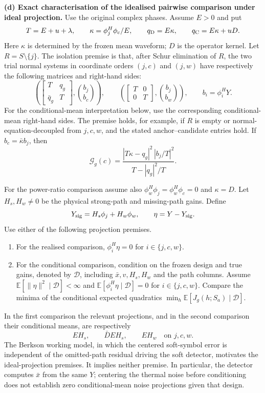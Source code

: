 \begin{afdmprop}
\medskip\noindent
\textup{\textbf{(d) Exact characterisation of the idealised pairwise
comparison under ideal projection.}}
Use the original complex phases. Assume $E>0$ and put
\[
 T=E+u+\lambda,\qquad \kappa=\phi_j^H\phi_c/E,\qquad
 q_{\rm D}=E\kappa,\qquad q_{\rm C}=E\kappa+uD .
\]
Here $\kappa$ is determined by the frozen mean waveform; $D$ is the
operator kernel. Let $R=S\setminus\{j\}$. The isolation premise is
that, after Schur elimination of $R$, the two trial normal systems
in coordinate orders $(j,c)$ and $(j,w)$ have respectively the
following matrices and right-hand sides:
\[
 \left(
 \begin{bmatrix} T&q_g\\ \bar q_g&T\end{bmatrix},
 \binom{b_j}{b_c}
 \right),\qquad
 \left(
 \begin{bmatrix} T&0\\0&T\end{bmatrix},
 \binom{b_j}{b_w}
 \right), \qquad b_i=\phi_i^HY .
\]
For the conditional-mean interpretation below, use the corresponding
conditional-mean right-hand sides. The premise holds, for example,
if $R$ is empty or normal-equation-decoupled from $j,c,w$, and the
stated anchor--candidate entries hold. If $b_c=\bar\kappa b_j$, then
\begin{equation}
 \mathcal G_g(c)=
 \frac{|T\kappa-q_g|^2\,|b_j/T|^2}{T-|q_g|^2/T}.
 \label{eq:af-admission}
\end{equation}

For the power-ratio comparison assume also
$\phi_w^H\phi_j=\phi_w^H\phi_c=0$ and $\kappa=D$. Let
$H_s,H_w\ne0$ be the physical strong-path and missing-path gains.
Define
\[
 Y_{\rm sig}=H_s\phi_j+H_w\phi_w,\qquad \eta=Y-Y_{\rm sig}.
\]
Use either of the following projection premises.
\begin{enumerate}
\item For the realised comparison,
$\phi_i^H\eta=0$ for $i\in\{j,c,w\}$.
\item For the conditional comparison, condition on the frozen design
and true gains, denoted by $\mathscr D$, including $\bar x,v,H_s,H_w$
and the path columns. Assume
$\mathbb E[\|\eta\|^2\mid\mathscr D]<\infty$ and
$\mathbb E[\phi_i^H\eta\mid\mathscr D]=0$ for $i\in\{j,c,w\}$.
Compare the minima of the conditional expected quadratics
$\min_h\mathbb E[J_g(h;S_a)\mid\mathscr D]$.
\end{enumerate}
In the first comparison the relevant projections, and in the second
comparison their conditional means, are respectively
\begin{equation}
 EH_s,\qquad \bar D EH_s,\qquad EH_w
 \quad\text{on }j,c,w.                                    \label{eq:af-ideal-projections}
\end{equation}
The Berkson working model, in which the centered soft-symbol error is
independent of the omitted-path residual driving the soft detector,
motivates the ideal-projection premises. It implies neither premise.
In particular, the detector computes $\bar x$ from the same $Y$;
centering the thermal noise before conditioning does not establish
zero conditional-mean noise projections given that design.


\end{afdmprop}
